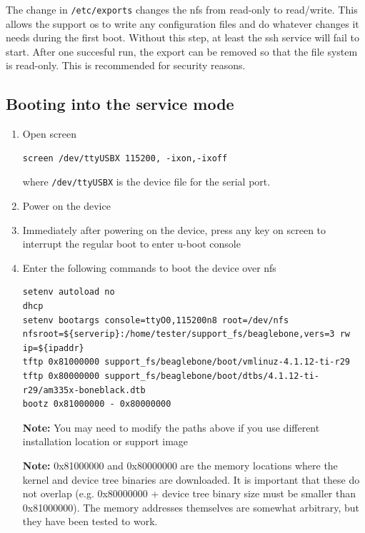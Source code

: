 \documentclass[a4paper,11pt]{article}
\newcommand{\note}{\textbf{Note: }}
\newcommand{\cmd}[1]{\texttt{#1}}
\begin{document}
The change in \cmd{/etc/exports} changes the nfs from read-only to read/write. This allows the support os to write any configuration files and do whatever changes it needs during the first boot. Without this step, at least the ssh service will fail to start. After one succesful run, the export can be removed so that the file system is read-only. This is recommended for security reasons.

\subsection{Booting into the service mode}
\label{bbbboot}

\begin{enumerate}
\item Open screen

\begin{lstlisting}
screen /dev/ttyUSBX 115200, -ixon,-ixoff
\end{lstlisting}
where \cmd{/dev/ttyUSBX} is the device file for the serial port.

\item Power on the device

\item Immediately after powering on the device, press any key on screen to interrupt the regular boot to enter u-boot console

\item Enter the following commands to boot the device over nfs

\begin{lstlisting}
setenv autoload no
dhcp
setenv bootargs console=ttyO0,115200n8 root=/dev/nfs nfsroot=${serverip}:/home/tester/support_fs/beaglebone,vers=3 rw ip=${ipaddr}
tftp 0x81000000 support_fs/beaglebone/boot/vmlinuz-4.1.12-ti-r29
tftp 0x80000000 support_fs/beaglebone/boot/dtbs/4.1.12-ti-r29/am335x-boneblack.dtb
bootz 0x81000000 - 0x80000000
\end{lstlisting}

\note You may need to modify the paths above if you use different installation location or support image

\note 0x81000000 and 0x80000000 are the memory locations where the kernel and device tree binaries are downloaded. It is important that these do not overlap (e.g. 0x80000000 + device tree binary size must be smaller than 0x81000000). The memory addresses themselves are somewhat arbitrary, but they have been tested to work.

\end{enumerate}
\end{document}
